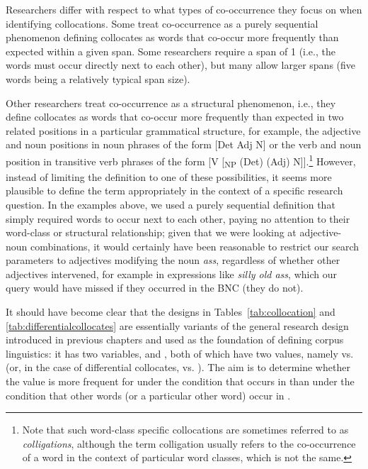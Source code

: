 Researchers differ with respect to what types of co\hyp{}occurrence they focus on when identifying collocations.  Some treat co\hyp{}occurrence as a purely sequential phenomenon defining collocates as words that co\hyp{}occur more frequently than expected  within a given span.  Some researchers require a span of 1 (i.e., the words must occur directly next to each other), but many allow larger spans (five words being a relatively typical span size).

Other researchers treat co\hyp{}occurrence as a structural phenomenon, i.e., they define collocates  as words that co\hyp{}occur more frequently than expected  in two related positions in a particular grammatical structure, for example, the adjective  and noun  positions in noun phrases of the form [Det Adj N] or the verb  and noun position in transitive  verb phrases of the form [V [\textsubscript{NP} (Det) (Adj) N]].\footnote{Note that such word\hyp{}class specific collocations  are sometimes referred to as \textit{colligations}, although the term colligation usually refers to the co\hyp{}occurrence of a word in the context of particular word classes, which is not the same.} However, instead of limiting the definition to one of these possibilities, it seems more plausible to define the term appropriately in the context of a specific research question. In the examples above, we used a purely sequential definition that simply required words to occur next to each other, paying no attention to their word\hyp{}class or structural relationship; given that we were looking at adjective\hyp{}noun  combinations, it would certainly have been reasonable to restrict our search parameters to adjectives  modifying the noun \textit{ass}, regardless of whether other adjectives  intervened, for example in expressions like \textit{silly old ass}, which our query  would have missed if they occurred in the BNC  (they do not).

It should have become clear that the designs  in Tables~\ref{tab:collocation} and \ref{tab:differentialcollocates} are essentially variants of the general research design introduced in previous chapters and used as the foundation of defining corpus linguistics: it has two variables,  and , both of which have two values, namely  vs.  (or, in the case of differential collocates,   vs. ). The aim is to determine whether the value  is more frequent for  under the condition that  occurs in  than under the condition that other words (or a particular other word) occur in .

